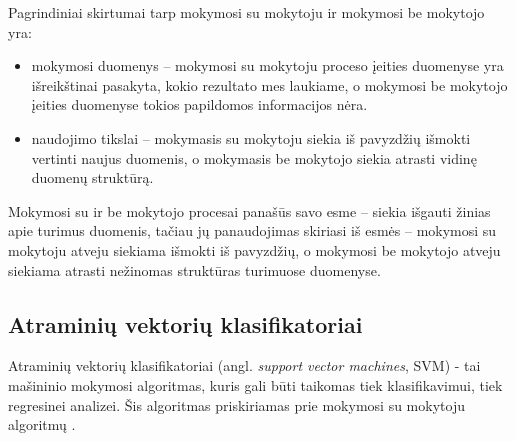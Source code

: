  Pagrindiniai skirtumai tarp mokymosi su mokytoju ir mokymosi be mokytojo yra:
\begin{itemize}
  \item mokymosi duomenys -- mokymosi su mokytoju proceso įeities duomenyse yra išreikštinai pasakyta, kokio rezultato mes laukiame, o mokymosi be mokytojo įeities duomenyse tokios papildomos informacijos nėra.
  \item  naudojimo tikslai -- mokymasis su mokytoju siekia iš pavyzdžių išmokti vertinti naujus duomenis, o mokymasis be mokytojo siekia atrasti vidinę duomenų struktūrą.
\end{itemize}
Mokymosi su ir be mokytojo procesai panašūs savo esme -- siekia išgauti žinias apie turimus duomenis, tačiau jų panaudojimas skiriasi iš esmės -- mokymosi su mokytoju atveju siekiama išmokti iš pavyzdžių, o mokymosi be mokytojo atveju siekiama atrasti nežinomas struktūras turimuose duomenyse.





\subsection{Atraminių vektorių klasifikatoriai}

Atraminių vektorių klasifikatoriai (angl. \textit{support vector machines}, SVM) - tai mašininio mokymosi algoritmas, kuris gali būti taikomas tiek klasifikavimui, tiek regresinei analizei. Šis algoritmas priskiriamas prie mokymosi su mokytoju algoritmų \cite{vapnik2000nature}.

